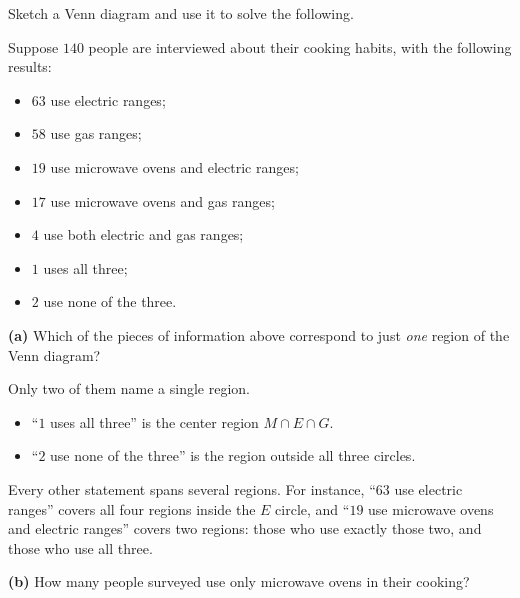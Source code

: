 \documentclass[12pt]{ximera}
\begin{document}
\begin{problem}
Sketch a Venn diagram and use it to solve the following.

Suppose $140$ people are interviewed about their cooking habits, with the following
results:
\begin{itemize}
    \item $63$ use electric ranges;
    \item $58$ use gas ranges;
    \item $19$ use microwave ovens and electric ranges;
    \item $17$ use microwave ovens and gas ranges;
    \item $4$ use both electric and gas ranges;
    \item $1$ uses all three;
    \item $2$ use none of the three.
\end{itemize}

\begin{prompt}
\textbf{(a)} Which of the pieces of information above correspond to just \emph{one}
region of the Venn diagram?

\begin{selectAll}
\end{selectAll}

\begin{feedback}
Only two of them name a single region.
\begin{itemize}
\item ``$1$ uses all three'' is the center region $M\cap E\cap G$.
\item ``$2$ use none of the three'' is the region outside all three circles.
\end{itemize}
Every other statement spans several regions. For instance, ``$63$ use electric
ranges'' covers all four regions inside the $E$ circle, and ``$19$ use microwave
ovens and electric ranges'' covers two regions: those who use exactly those two, and
those who use all three.
\end{feedback}
\end{prompt}

\begin{prompt}
\textbf{(b)} How many people surveyed use only microwave ovens in their cooking?


\end{prompt}
\end{problem}
\end{document}
